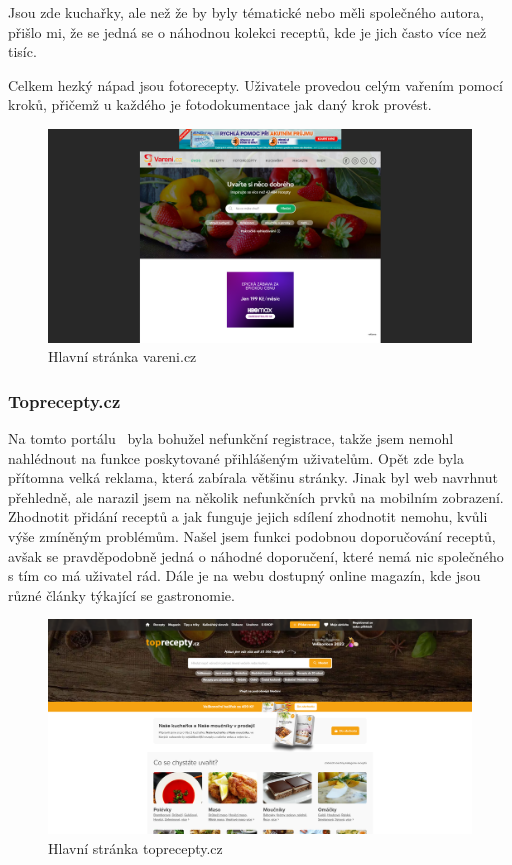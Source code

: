 Jsou zde kuchařky, ale než že by byly tématické nebo měli společného autora, přišlo mi, že se jedná se o náhodnou kolekci receptů,
kde je jich často více než tisíc.

Celkem hezký nápad jsou fotorecepty. Uživatele provedou celým vařením pomocí kroků, přičemž u každého je fotodokumentace jak daný krok
provést.

\begin{figure}[H]
    \includegraphics[width=\textwidth]{images/varenicz-uvodni-stranka}
    \caption{Hlavní stránka vareni.cz} \label{picture:varenicz:uvodni-stranka}
\end{figure}

\subsubsection{Toprecepty.cz}

Na tomto portálu~\cite{TopreceptyCZ} byla bohužel nefunkční registrace, takže jsem nemohl nahlédnout na funkce poskytované přihlášeným
uživatelům. Opět zde byla přítomna velká reklama, která zabírala většinu stránky. Jinak byl web navrhnut přehledně,
ale narazil jsem na několik nefunkčních prvků na mobilním zobrazení. Zhodnotit přidání receptů a jak funguje jejich
sdílení zhodnotit nemohu, kvůli výše zmíněným problémům. Našel jsem funkci podobnou doporučování receptů, avšak se
pravděpodobně jedná o náhodné doporučení, které nemá nic společného s tím co má uživatel rád. Dále je na webu dostupný
online magazín, kde jsou různé články týkající se gastronomie.

\begin{figure}[H]
    \includegraphics[width=\textwidth]{images/topreceptycz-uvodni-stranka}
    \caption{Hlavní stránka toprecepty.cz} \label{picture:topreceptycz:uvodni-stranka}
\end{figure}

